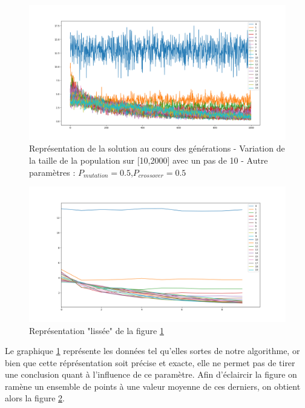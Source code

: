 \documentclass[12pt]{report}
\begin{document}
        \begin{figure}[h]
          \centering
          \includegraphics[width=15cm]{img/evo_pop_size_brut.png}
          \caption{Représentation de la solution au cours des générations - Variation de la taille de la population sur [10,2000] avec un pas de 10 - Autre paramètres : $P_{mutation} = 0.5$,$P_{crossover} = 0.5$}
          \label{evo_pop_size_brut}
        \end{figure}

        \begin{figure}[h]
          \centering
          \includegraphics[width=15cm]{img/evo_pop_size_moy.png}
          \caption{Représentation "lissée" de la figure \ref{evo_pop_size_brut}}
          \label{evo_pop_size_moy}
        \end{figure}

        Le graphique \ref{evo_pop_size_brut} représente les données tel qu'elles sortes de notre algorithme, or bien que cette réprésentation soit précise et exacte, elle ne permet pas de tirer une conclusion quant à l'influence de ce paramètre. Afin d'éclaircir la figure on ramène un ensemble de points à une valeur moyenne de ces derniers, on obtient alors la figure \ref{evo_pop_size_moy}. \\
\end{document}
